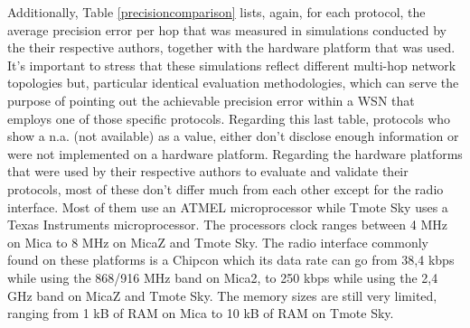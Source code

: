Additionally, Table \ref{precisioncomparison} lists, again, for each protocol, the average precision error per hop that was measured in simulations conducted by the their respective authors, together with the hardware platform that was used. 
It's important to stress that these simulations reflect different multi-hop network topologies  but, particular identical evaluation methodologies, which can serve the purpose of pointing out the achievable precision error within a WSN that employs one of those specific protocols. Regarding this last table, protocols who show a n.a. (not available) as a value, either don't disclose enough information or were not implemented on a hardware platform. Regarding the hardware platforms that were used by their respective authors to evaluate and validate their protocols, most of these don't differ much from each other except for the radio interface. Most of them use an ATMEL microprocessor while Tmote Sky uses a Texas Instruments microprocessor. The processors clock ranges between 4 MHz on Mica to 8 MHz on MicaZ and Tmote Sky. The radio interface commonly found on these platforms is a Chipcon which its data rate can go from 38,4 kbps while using
the 868/916 MHz band on Mica2, to 250 kbps while using the 2,4 GHz band on MicaZ and Tmote Sky. The memory sizes are still very limited, ranging from 1 kB of RAM on Mica to 10 kB of RAM on Tmote Sky.

